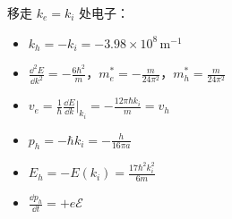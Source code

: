 \begin{derivationbox}
移走 $k_e=k_i$ 处电子：
\begin{itemize}[nosep]
    \item $k_h=-k_i=-3.98\times10^8\,\text{m}^{-1}$
    \item $\frac{\dd^2E}{\dd k^2}=-\frac{6\hbar^2}{m}$，$m_e^*=-\frac{m}{24\pi^2}$，$m_h^*=\frac{m}{24\pi^2}$
    \item $v_e=\frac{1}{\hbar}\frac{\dd E}{\dd k}\big|_{k_i}=-\frac{12\pi\hbar k_i}{m}=v_h$
    \item $p_h=-\hbar k_i=-\frac{h}{16\pi a}$
    \item $E_h=-E(k_i)=\frac{17\hbar^2k_i^2}{6m}$
    \item $\frac{\dd p_h}{\dd t}=+e\mathcal{E}$
\end{itemize}
\end{derivationbox}

\vspace{1em}
